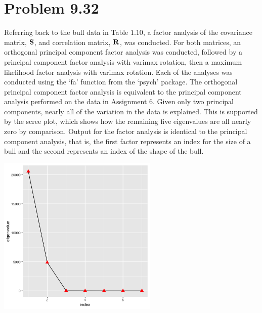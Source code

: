 \newpage
\section*{Problem 9.32} 
Referring back to the bull data in Table $1.10$, a factor analysis of the covariance matrix, $\mathrm{\bf{S}}$, and correlation matrix, $\mathrm{\bf{R}}$, was conducted. For both matrices, an orthogonal principal component factor analysis was conducted, followed by a principal component factor analysis with varimax rotation, then a maximum likelihood factor analysis with varimax rotation. Each of the analyses was conducted using the `fa' function from the `psych' package. The orthogonal principal component factor analysis is equivalent to the principal component analysis performed on the data in Assignment 6. Given only two principal components, nearly all of the variation in the data is explained. This is supported by the scree plot, which shows how the remaining five eigenvalues are all nearly zero by comparison. Output for the factor analysis is identical to the principal component analysis, that is, the first factor represents an index for the size of a bull and the second represents an index of the shape of the bull. 

\begin{center}
	\includegraphics[width=3.0in]{9_32_S_scree.png}
\end{center}

